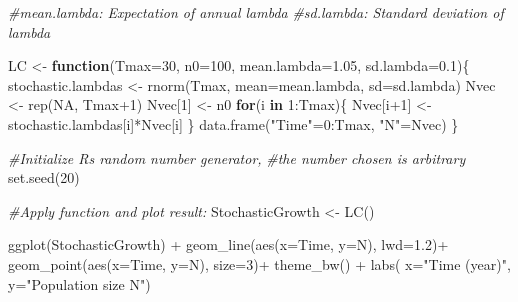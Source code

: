 \documentclass[
]{book}
\newenvironment{Shaded}{\begin{snugshade}}{\end{snugshade}}
\newcommand{\AttributeTok}[1]{\textcolor[rgb]{0.77,0.63,0.00}{#1}}
\newcommand{\CommentTok}[1]{\textcolor[rgb]{0.56,0.35,0.01}{\textit{#1}}}
\newcommand{\ConstantTok}[1]{\textcolor[rgb]{0.00,0.00,0.00}{#1}}
\newcommand{\ControlFlowTok}[1]{\textcolor[rgb]{0.13,0.29,0.53}{\textbf{#1}}}
\newcommand{\DecValTok}[1]{\textcolor[rgb]{0.00,0.00,0.81}{#1}}
\newcommand{\FloatTok}[1]{\textcolor[rgb]{0.00,0.00,0.81}{#1}}
\newcommand{\FunctionTok}[1]{\textcolor[rgb]{0.00,0.00,0.00}{#1}}
\newcommand{\NormalTok}[1]{#1}
\newcommand{\OtherTok}[1]{\textcolor[rgb]{0.56,0.35,0.01}{#1}}
\newcommand{\SpecialCharTok}[1]{\textcolor[rgb]{0.00,0.00,0.00}{#1}}
\newcommand{\StringTok}[1]{\textcolor[rgb]{0.31,0.60,0.02}{#1}}
\begin{document}
\begin{Shaded}
\begin{Highlighting}[]
\CommentTok{\#mean.lambda: Expectation of annual lambda}
\CommentTok{\#sd.lambda: Standard deviation of lambda}

\NormalTok{LC }\OtherTok{\textless{}{-}} \ControlFlowTok{function}\NormalTok{(}\AttributeTok{Tmax=}\DecValTok{30}\NormalTok{, }
               \AttributeTok{n0=}\DecValTok{100}\NormalTok{, }
               \AttributeTok{mean.lambda=}\FloatTok{1.05}\NormalTok{, }
               \AttributeTok{sd.lambda=}\FloatTok{0.1}\NormalTok{)\{}
\NormalTok{  stochastic.lambdas }\OtherTok{\textless{}{-}} \FunctionTok{rnorm}\NormalTok{(Tmax, }
                              \AttributeTok{mean=}\NormalTok{mean.lambda, }
                              \AttributeTok{sd=}\NormalTok{sd.lambda)}
\NormalTok{  Nvec }\OtherTok{\textless{}{-}} \FunctionTok{rep}\NormalTok{(}\ConstantTok{NA}\NormalTok{, Tmax}\SpecialCharTok{+}\DecValTok{1}\NormalTok{)}
\NormalTok{  Nvec[}\DecValTok{1}\NormalTok{] }\OtherTok{\textless{}{-}}\NormalTok{ n0}
  \ControlFlowTok{for}\NormalTok{(i }\ControlFlowTok{in} \DecValTok{1}\SpecialCharTok{:}\NormalTok{Tmax)\{}
\NormalTok{    Nvec[i}\SpecialCharTok{+}\DecValTok{1}\NormalTok{] }\OtherTok{\textless{}{-}}\NormalTok{ stochastic.lambdas[i]}\SpecialCharTok{*}\NormalTok{Nvec[i]}
\NormalTok{  \}}
  \FunctionTok{data.frame}\NormalTok{(}\StringTok{"Time"}\OtherTok{=}\DecValTok{0}\SpecialCharTok{:}\NormalTok{Tmax, }\StringTok{"N"}\OtherTok{=}\NormalTok{Nvec)}
\NormalTok{\}}

\CommentTok{\#Initialize R\textquotesingle{}s random number generator,}
\CommentTok{\#the number chosen is arbitrary}
\FunctionTok{set.seed}\NormalTok{(}\DecValTok{20}\NormalTok{)  }

\CommentTok{\#Apply function and plot result:}
\NormalTok{StochasticGrowth }\OtherTok{\textless{}{-}} \FunctionTok{LC}\NormalTok{()}

\FunctionTok{ggplot}\NormalTok{(StochasticGrowth) }\SpecialCharTok{+} 
  \FunctionTok{geom\_line}\NormalTok{(}\FunctionTok{aes}\NormalTok{(}\AttributeTok{x=}\NormalTok{Time, }\AttributeTok{y=}\NormalTok{N), }\AttributeTok{lwd=}\FloatTok{1.2}\NormalTok{)}\SpecialCharTok{+}
  \FunctionTok{geom\_point}\NormalTok{(}\FunctionTok{aes}\NormalTok{(}\AttributeTok{x=}\NormalTok{Time, }\AttributeTok{y=}\NormalTok{N), }\AttributeTok{size=}\DecValTok{3}\NormalTok{)}\SpecialCharTok{+}
  \FunctionTok{theme\_bw}\NormalTok{() }\SpecialCharTok{+}
  \FunctionTok{labs}\NormalTok{( }\AttributeTok{x=}\StringTok{"Time (year)"}\NormalTok{, }\AttributeTok{y=}\StringTok{"Population size N"}\NormalTok{)  }
\end{Highlighting}
\end{Shaded}
\end{document}
